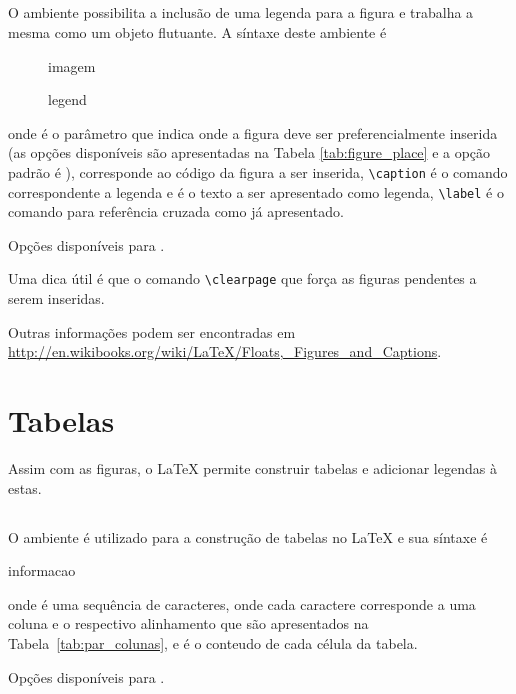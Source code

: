 \subsection{}
O ambiente  possibilita a inclusão de uma legenda para a figura e trabalha a mesma como um objeto flutuante. A síntaxe deste ambiente é
\begin{code}
\begin{figure}[place]
    imagem
    \caption{legend}
    \label{P:imagem}
\end{figure}
\end{code}
onde  é o parâmetro que indica onde a figura deve ser preferencialmente inserida (as opções disponíveis são apresentadas na Tabela \ref{tab:figure_place} e a opção padrão é ),  corresponde ao código da figura a ser inserida, \lstinline!\caption! é o comando correspondente a legenda e  é o texto a ser apresentado como legenda, \lstinline!\label! é o comando para referência cruzada como já apresentado. \\
\begin{table}[!htb]
    \centering
    \caption{Opções disponíveis para .}
    \label{tab:figure_place}
    
\end{table}

Uma dica útil é que o comando \lstinline!\clearpage! que força as figuras pendentes a serem inseridas.

Outras informações podem ser encontradas em \url{http://en.wikibooks.org/wiki/LaTeX/Floats,_Figures_and_Captions}.

\section{Tabelas}
Assim com as figuras, o LaTeX permite construir tabelas e adicionar legendas \`{a} estas.

\subsection{}
O ambiente  é utilizado para a construção de tabelas no LaTeX e sua síntaxe é
\begin{code}
\begin{tabular}[colunas]
    informacao
\end{tabular}
\end{code}
onde  é uma sequência de caracteres, onde cada caractere corresponde a uma coluna e o respectivo alinhamento que são apresentados na Tabela~\ref{tab:par_colunas}, e  é o conteudo de cada célula da tabela.
\begin{table}[h!tb]
    \centering
    \caption{Opções disponíveis para .}
    \label{tab:par_colunas}
    
\end{table}

